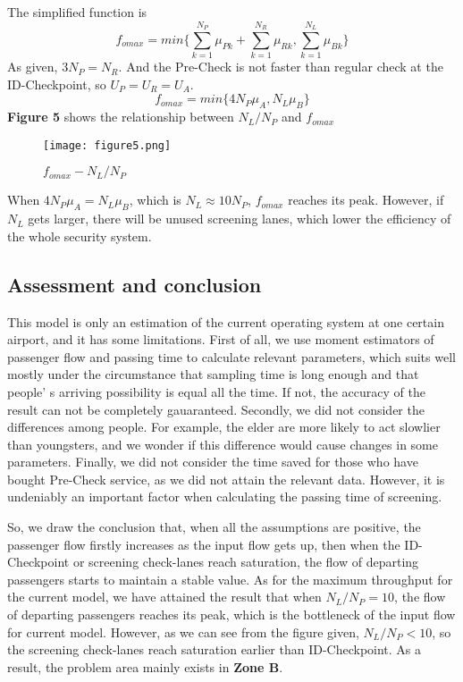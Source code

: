 \documentclass{mcmthesis}
\begin{document}
	The simplified function is
	$$f_{o max}= min\{\sum_{k=1}^{N_P}\mu_{Pk}+\sum_{k=1}^{N_R}\mu_{Rk},\sum_{k=1}^{N_L}\mu_{Bk}\}$$
	As given, $3N_P=N_R$. And the Pre-Check is not faster than regular check at the ID-Checkpoint, so $U_P=U_R=U_A$.
	$$f_{o max}= min\{4N_P\mu_A,N_L\mu_B\}$$
	\textbf{Figure 5} shows the relationship between $N_L/N_P$ and $f_{omax}$
	
	\begin{figure}[H]
		\small
		\centering
		\texttt{[image: figure5.png]}
		\caption{$f_{omax}-N_L/N_P$} \label{fig:$f_{omax}-N_L/N_P$}
	\end{figure}
	\noindent When $4N_P\mu_A=N_L\mu_B$, which is $N_L\approx10N_P$, $f_{omax}$ reaches its peak. However, if $N_L$ gets larger, there will be unused screening lanes, which lower the efficiency of the whole security system.
	\subsection{Assessment and conclusion}
	This model is only an estimation of the current operating system at one certain airport, and it has some limitations. First of all, we use moment estimators of passenger flow and passing time to calculate relevant parameters, which suits well mostly under the circumstance that sampling time is long enough and that people' s  arriving possibility is equal all the time. If not, the accuracy of the result can not be completely gauaranteed. Secondly, we did not consider the differences among people. For example, the elder are more likely to act slowlier than youngsters, and we wonder if this difference would cause changes in some parameters. Finally, we did not consider the time saved for those who have bought Pre-Check service, as we did not attain the relevant data. However, it is undeniably an important factor when calculating the passing time of screening.
	
	So, we draw the conclusion that, when all the assumptions are positive, the passenger flow firstly increases as the input flow gets up, then when the ID-Checkpoint or screening check-lanes reach saturation, the flow of departing passengers starts to maintain a stable value. As for the maximum throughput for the current model, we have attained the result that when $N_L/N_P=10$, the flow of departing passengers reaches its peak, which is the bottleneck of the input flow for current model. However, as we can see from the figure given, $N_L/N_P<10$, so the screening check-lanes reach saturation earlier than ID-Checkpoint. As a result, the problem area mainly exists in \textbf{Zone B}.
	
\end{document}
